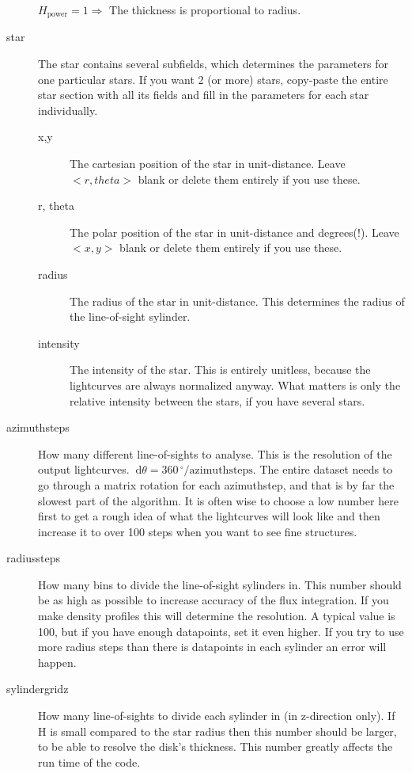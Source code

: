 \documentclass[a4paper, 12pt, english, titlepage]{article}
\newcommand{\D}[1]{\ \mathrm{d}#1} %
\newcommand{\degree}{\, ^\circ}    %
\begin{document}
\begin{description}
            $H_\textrm{power} = 1 \Rightarrow$ The thickness is proportional to radius.
        \item[star]
            The star contains several subfields, which determines the parameters for one particular stars. If you want 2 (or more) stars, copy-paste the entire star section with all its fields and fill in the parameters for each star individually.
            \begin{description}
                \item[x,y]
                    The cartesian position of the star in unit-distance.
                    Leave $<r,theta>$ blank or delete them entirely if you use these.
                \item[r, theta]
                    The polar position of the star in unit-distance and degrees(!).
                    Leave $<x,y>$ blank or delete them entirely if you use these.
                \item[radius]
                    The radius of the star in unit-distance. This determines the radius of the line-of-sight sylinder.
                \item[intensity]
                    The intensity of the star. This is entirely unitless, because the lightcurves are always normalized anyway. What matters is only the relative intensity between the stars, if you have several stars.
            \end{description}

        \item[azimuthsteps]
            How many different line-of-sights to analyse. This is the resolution of the output lightcurves. $\D \theta = 360\degree / \textrm{azimuthsteps}$. The entire dataset needs to go through a matrix rotation for each azimuthstep, and that is by far the slowest part of the algorithm. It is often wise to choose a low number here first to get a rough idea of what the lightcurves will look like and then increase it to over 100 steps when you want to see fine structures.
        \item[radiussteps]
            How many bins to divide the line-of-sight sylinders in. This number should be as high as possible to increase accuracy of the flux integration. If you make density profiles this will determine the resolution. A typical value is 100, but if you have enough datapoints, set it even higher. If you try to use more radius steps than there is datapoints in each sylinder an error will happen.
        \item[sylindergridz]
            How many line-of-sights to divide each sylinder in (in z-direction only). If H is small compared to the star radius then this number should be larger, to be able to resolve the disk's thickness. This number greatly affects the run time of the code.
    \end{description}
\end{document}
